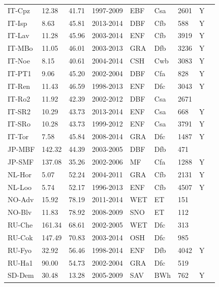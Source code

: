 \documentclass{myreport}
\begin{document}
\begin{longtable}{lllllllll}
  IT-Cpz & 12.38 & 41.71 & 1997-2009 & EBF & Csa & 2601 & Y & \citet{IT-Cpz} \\ 
  IT-Isp & 8.63 & 45.81 & 2013-2014 & DBF & Cfb & 588 & Y & \citet{IT-Isp} \\ 
  IT-Lav & 11.28 & 45.96 & 2003-2014 & ENF & Cfb & 3919 & Y & \citet{IT-Lav} \\ 
  IT-MBo & 11.05 & 46.01 & 2003-2013 & GRA & Dfb & 3236 & Y & \citet{IT-MBo} \\ 
  IT-Noe & 8.15 & 40.61 & 2004-2014 & CSH & Cwb & 3083 & Y & \citet{IT-Noe} \\ 
  IT-PT1 & 9.06 & 45.20 & 2002-2004 & DBF & Cfa & 828 & Y & \citet{IT-PT1} \\ 
  IT-Ren & 11.43 & 46.59 & 1998-2013 & ENF & Dfc & 3043 & Y & \citet{IT-Ren} \\ 
  IT-Ro2 & 11.92 & 42.39 & 2002-2012 & DBF & Csa & 2671 &  & \citet{IT-Ro2} \\ 
  IT-SR2 & 10.29 & 43.73 & 2013-2014 & ENF & Csa & 668 & Y & \citet{IT-SR2} \\ 
  IT-SRo & 10.28 & 43.73 & 1999-2012 & ENF & Csa & 3791 & Y & \citet{IT-SRo} \\ 
  IT-Tor & 7.58 & 45.84 & 2008-2014 & GRA & Dfc & 1487 & Y & \citet{IT-Tor} \\ 
  JP-MBF & 142.32 & 44.39 & 2003-2005 & DBF & Dfb & 471 &  & \citet{JP-MBF} \\ 
  JP-SMF & 137.08 & 35.26 & 2002-2006 & MF & Cfa & 1288 & Y & \citet{JP-SMF} \\ 
  NL-Hor & 5.07 & 52.24 & 2004-2011 & GRA & Cfb & 2131 & Y & \citet{NL-Hor} \\ 
  NL-Loo & 5.74 & 52.17 & 1996-2013 & ENF & Cfb & 4507 & Y & \citet{NL-Loo} \\ 
  NO-Adv & 15.92 & 78.19 & 2011-2014 & WET & ET & 151 &  & \citet{NO-Adv} \\ 
  NO-Blv & 11.83 & 78.92 & 2008-2009 & SNO & ET & 112 &  & \citet{NO-Blv} \\ 
  RU-Che & 161.34 & 68.61 & 2002-2005 & WET & Dfc & 313 &  & \citet{RU-Che} \\ 
  RU-Cok & 147.49 & 70.83 & 2003-2014 & OSH & Dfc & 985 &  & \citet{RU-Cok} \\ 
  RU-Fyo & 32.92 & 56.46 & 1998-2014 & ENF & Dfb & 4042 & Y & \citet{RU-Fyo} \\ 
  RU-Ha1 & 90.00 & 54.73 & 2002-2004 & GRA & Dfc & 519 &  & \citet{RU-Ha1} \\ 
  SD-Dem & 30.48 & 13.28 & 2005-2009 & SAV & BWh & 762 & Y & \citet{SD-Dem} \\ 

\end{longtable}
\end{document}
